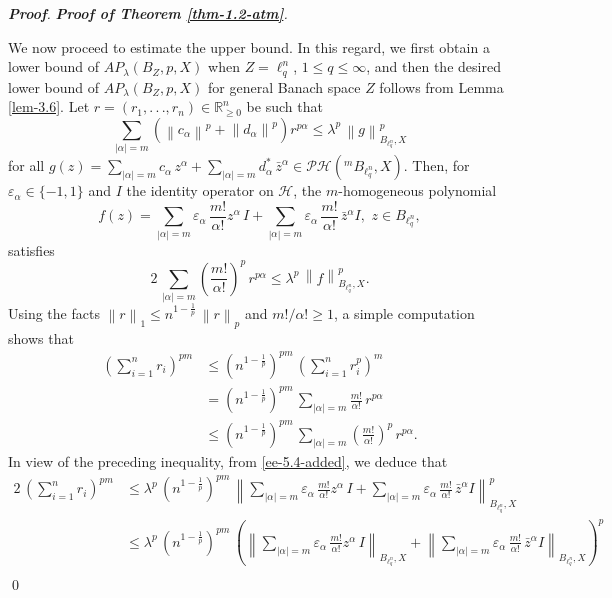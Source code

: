 \documentclass[a4paper,11pt, reqno]{amsart}
\theoremstyle{definition}
\newenvironment{pf}[1][]{%
	\vskip 3mm
	\noindent
	\ifthenelse{\equal{#1}{}}%
	{{\slshape {\bf Proof}. }}%
	{{\slshape #1.} }%
}%
{\qed\bigskip}
\newcommand{\norm}[1]{\left\lVert#1\right\rVert}
\begin{document}
\begin{pf}[{\bf Proof of Theorem \ref{thm-1.2-atm}}]
We now proceed to estimate the upper bound. In this regard, we first obtain a lower bound of $AP_{\lambda}(B_{Z}, p,X)$ when $Z=\ell^n_q$, $1 \leq q \leq \infty$, and then the desired lower bound of $AP_{\lambda}(B_{Z}, p,X)$ for general Banach space $Z$ follows from Lemma \ref{lem-3.6}. Let $r=(r_1,.\,.\,., r_n)\in \mathbb{R}^n_{\geq 0}$ be such that 
\begin{equation*}
	\sum_{|\alpha|=m} (\norm{c_{\alpha}}^p + \norm{d_{\alpha}}^p)r^{p \alpha} \leq \lambda^p \, \norm{g}^p_{B_{\ell^n_q}, X}	
\end{equation*}
for all $g(z)=\sum_{|\alpha|=m} c_{\alpha}\, z^{\alpha} +  \sum_{|\alpha|=m} d^{*}_{\alpha}\, \bar{z}^{\alpha}\in \mathcal{PH}(^mB_{\ell^n_q},X)$. Then, for $\varepsilon_{\alpha} \in \{-1,1\}$ and $I$ the identity operator on $\mathcal{H}$, the $m$-homogeneous polynomial
\begin{equation*}
f(z)=\sum_{|\alpha|=m} \varepsilon_{\alpha}\, \frac{m!}{\alpha!}z^{\alpha}\, I +  \sum_{|\alpha|=m} \varepsilon_{\alpha}\,\frac{m!}{\alpha!}\, \bar{z}^{\alpha} I, \,\, z \in B_{\ell^n_q},
\end{equation*} 
satisfies
\begin{equation} \label{ee-5.4-added}
2\, \sum_{|\alpha|=m}  \left(\frac{m!}{\alpha!}\right)^p\, r^{p\alpha} \leq \lambda^p \,\norm{f}^p_{B_{\ell^n_q},X}.
\end{equation}
Using the facts $\norm{r}_1 \leq n^{1-\frac{1}{p}}\, \norm{r}_p$ and $m! /\alpha! \geq 1$, a simple computation shows that
\begin{align*}
\left(\sum_{i=1}^{n}r_i\right)^{pm} 
& \leq \left(n^{1-\frac{1}{p}}\right)^{pm}\, \left(\sum_{i=1}^{n}r^p_i\right)^m \nonumber \\
& = \left(n^{1-\frac{1}{p}}\right)^{pm}\, \sum_{|\alpha|=m} \frac{m!}{\alpha!}\, r^{p \alpha} \nonumber \\
& \leq \left(n^{1-\frac{1}{p}}\right)^{pm}\, \sum_{|\alpha|=m} \left(\frac{m!}{\alpha!}\right)^p\, r^{p \alpha}.
\end{align*}
In view of the preceding inequality, from \eqref{ee-5.4-added}, we deduce that
\begin{align} \label{ee-5.5-added}
2\, \left(\sum_{i=1}^{n}r_i\right)^{pm} 
& \leq \lambda^p\, \left(n^{1-\frac{1}{p}}\right)^{pm}\, \norm{\sum_{|\alpha|=m} \varepsilon_{\alpha}\, \frac{m!}{\alpha!}z^{\alpha}\, I +  \sum_{|\alpha|=m} \varepsilon_{\alpha}\,\frac{m!}{\alpha!}\, \bar{z}^{\alpha} I}^p_{B_{\ell^n_q},X} \nonumber\\
& \leq \lambda^p\, \left(n^{1-\frac{1}{p}}\right)^{pm}\, \left(\norm{\sum_{|\alpha|=m} \varepsilon_{\alpha}\, \frac{m!}{\alpha!}z^{\alpha}\, I}_{B_{\ell^n_q},X} + \norm{\sum_{|\alpha|=m} \varepsilon_{\alpha}\,\frac{m!}{\alpha!}\, \bar{z}^{\alpha} I}_{B_{\ell^n_q},X}\right)^p \nonumber \\

\end{align}
\end{pf}
\end{document}
